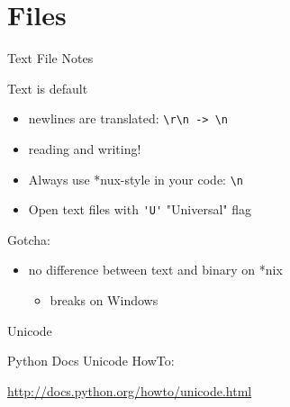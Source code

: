 \documentclass{beamer}
\begin{document}
\section{Files}


\begin{frame}[fragile]{Text File Notes}

{\Large Text is default}
\begin{itemize}
  \item newlines are translated: \verb|\r\n -> \n|
  \item reading and writing!
  \item Always use *nux-style in your code: \verb|\n|
  \item Open text files with \verb|'U'| "Universal" flag
\end{itemize}

\vfill
{\Large Gotcha:}
\begin{itemize}
  \item  no difference between text and binary on *nix\\
  \begin{itemize}
    \item breaks on Windows
  \end{itemize}
\end{itemize}

\end{frame}

\begin{frame}[fragile]{Unicode}

{\Large Python Docs Unicode HowTo:}

\url{http://docs.python.org/howto/unicode.html}

\end{frame}
\end{document}

